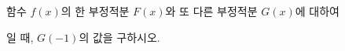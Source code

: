 함수 $f(x)$의 한 부정적분 $F(x)$와 또 다른 부정적분 $G(x)$에 대하여\par\smallskip{}\par\smallskip\noindent 일 때, $G(-1)$의 값을 구하시오.
